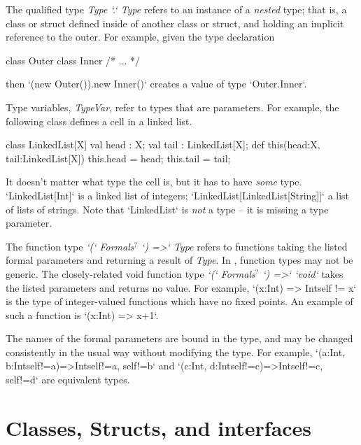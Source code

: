 The qualified type {\em Type \xcd`.` Type} refers to an instance of a {\em
nested} type; that is, a class or struct defined inside of another class or
struct, and holding an implicit reference to the outer.  For example, given
the type declaration 
\begin{xten}
class Outer {
  class Inner { /* ... */ }
}
\end{xten}
%
then 
\xcd`(new Outer()).new Inner()` creates a value of type 
\xcd`Outer.Inner`.

Type variables, {\em TypeVar}, refer to types that are parameters.  For
example, the following class defines a cell in a linked list.  
\begin{xten}
class LinkedList[X] {
  val head : X;
  val tail : LinkedList[X];
  def this(head:X, tail:LinkedList[X]) {
     this.head = head; this.tail = tail;
  }
}
\end{xten}
%
It doesn't
matter what type the cell is, but it has to have {\em some} type.
\xcd`LinkedList[Int]` is a linked list of integers;
\xcd`LinkedList[LinkedList[String]]` a list of lists of strings.
Note that \xcd`LinkedList` is {\em not} a type -- it is missing a type parameter.



The function type 
{\em \xcd`(` Formals{$^?$} \xcd`) =>`  Type} 
refers to functions taking the
listed formal parameters and returning a result of {\em Type}.  In
\XtenCurrVer, function types may not be generic.
The closely-related void function type 
{\em \xcd`(` Formals{$^?$} \xcd`) =>`  \xcd`void`}  takes the listed
parameters and returns no value.
For example, 
\xcd`(x:Int) => Int{self != x}` 
is the type of integer-valued functions which have no fixed points.  
An example of such a function is \xcd`(x:Int) => x+1`.

The names of the formal parameters are bound in the type, and may be changed
consistently in the usual way without modifying the type.  
For example, 
\xcd`(a:Int, b:Int{self!=a})=>Int{self!=a, self!=b}` 
and 
\xcd`(c:Int, d:Int{self!=c})=>Int{self!=c, self!=d}` 
are equivalent types.  



\section{Classes, Structs,  and interfaces}
\label{ReferenceTypes}

